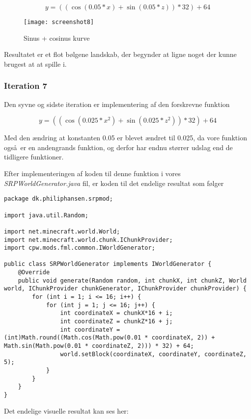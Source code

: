 \documentclass[a4paper,12pt]{report}
\begin{document}
			\[y = ((\cos (0.05 * x) + \sin (0.05 * z)) * 32) + 64\]

			\begin{wrapfigure}{r}{0.5\textwidth}
				\texttt{[image: screenshot8]}
				\caption{Sinus + cosinus kurve}
			\end{wrapfigure}

			Resultatet er et flot b\o lgene landskab, der begynder at ligne noget der kunne brugest at at spille i.

		\subsubsection{Iteration 7}
			Den syvne og sidste iteration er implementering af den forskrevne funktion 

			\[y = ((\cos (0.025 * x^2) + \sin (0.025 * z^2)) * 32) + 64\]

			Med den \ae ndring at konstanten 0.05 er blevet \ae ndret til 0.025, da vore funktion ogs\aa \ er en andengrands funktion,
			og derfor har endnu st\o rrer udslag end de tidligere funktioner.

			Efter implementeringen af koden til denne funktion i vores \emph{SRPWorldGenerator.java} fil, er koden til det endelige resultat som
			f\o lger

\begin{lstlisting}[label=SRPWorldGenerator-final,caption=SRPWorldGenerator.java]
package dk.philiphansen.srpmod;

import java.util.Random;

import net.minecraft.world.World;
import net.minecraft.world.chunk.IChunkProvider;
import cpw.mods.fml.common.IWorldGenerator;

public class SRPWorldGenerator implements IWorldGenerator {
    @Override
    public void generate(Random random, int chunkX, int chunkZ, World world, IChunkProvider chunkGenerator, IChunkProvider chunkProvider) {
        for (int i = 1; i <= 16; i++) {
            for (int j = 1; j <= 16; j++) {
                int coordinateX = chunkX*16 + i;
                int coordinateZ = chunkZ*16 + j;
                int coordinateY = (int)Math.round((Math.cos(Math.pow(0.01 * coordinateX, 2)) + Math.sin(Math.pow(0.01 * coordinateZ, 2))) * 32) + 64;
                world.setBlock(coordinateX, coordinateY, coordinateZ, 5);			
            }
        }
    }
}
\end{lstlisting}

			Det endelige visuelle resultat kan ses her:
\end{document}
